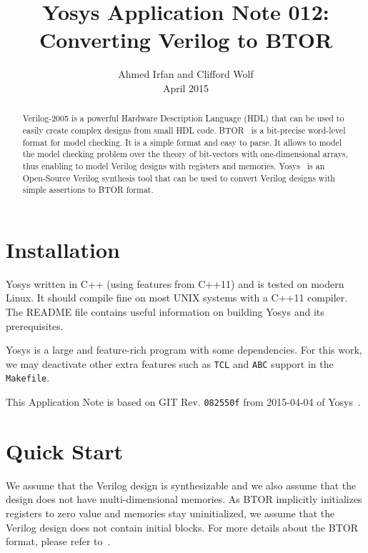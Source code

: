 \documentclass[9pt,technote,a4paper]{IEEEtran}
\begin{document}
\title{Yosys Application Note 012: \\ Converting Verilog to BTOR}
\author{Ahmed Irfan and Clifford Wolf \\ April 2015}
\maketitle

\begin{abstract}
Verilog-2005 is a powerful Hardware Description Language (HDL) that
can be used to easily create complex designs from small HDL code.
BTOR~\cite{btor} is a bit-precise word-level format for model
checking.  It is a simple format and easy to parse. It allows to model
the model checking problem over the theory of bit-vectors with
one-dimensional arrays, thus enabling to model Verilog designs with
registers and memories.  Yosys~\cite{yosys} is an Open-Source Verilog
synthesis tool that can be used to convert Verilog designs with simple
assertions to BTOR format.

\end{abstract}

\section{Installation}

Yosys written in C++ (using features from C++11) and is tested on
modern Linux.  It should compile fine on most UNIX systems with a
C++11 compiler. The README file contains useful information on
building Yosys and its prerequisites.

Yosys is a large and feature-rich program with some dependencies. For
this work, we may deactivate other extra features such as {\tt TCL}
and {\tt ABC} support in the {\tt Makefile}.

\bigskip

This Application Note is based on GIT Rev. {\tt 082550f} from
2015-04-04 of Yosys~\cite{yosys}.

\section{Quick Start}

We assume that the Verilog design is synthesizable and we also assume
that the design does not have multi-dimensional memories.  As BTOR
implicitly initializes registers to zero value and memories stay
uninitialized, we assume that the Verilog design does
not contain initial blocks. For more details about the BTOR format,
please refer to~\cite{btor}.
\end{document}
